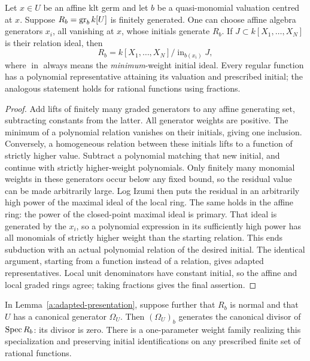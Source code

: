 \begin{lemma}\label{a:adapted-presentation}
Let \(x\in U\) be an affine klt germ and let \(b\) be a quasi-monomial
valuation centred at \(x\). Suppose \(R_b=\operatorname{gr}_b k[U]\) is finitely
generated. One can choose affine algebra generators \(x_i\), all
vanishing at \(x\), whose initials generate \(R_b\). If
\(J\subset k[X_1,\ldots,X_N]\) is their relation ideal, then
\[
 R_b=k[X_1,\ldots,X_N]/\operatorname{in}_{b(x_i)}J,
\]
where \(\operatorname{in}\) always means the \emph{minimum}-weight
initial ideal. Every regular function has a polynomial representative
attaining its valuation and prescribed initial; the analogous statement
holds for rational functions using fractions.
\end{lemma}

\begin{proof}
Add lifts of finitely many graded generators to any affine generating
set, subtracting constants from the latter. All generator weights are
positive. The minimum of a polynomial relation vanishes on their
initials, giving one inclusion. Conversely, a homogeneous relation
between these initials lifts to a function of strictly higher value.
Subtract a polynomial matching that new initial, and continue with
strictly higher-weight polynomials. Only finitely many monomial weights in these generators
occur below any fixed bound, so the residual value can be made
arbitrarily large. Log Izumi then puts the residual in an arbitrarily
high power of the maximal ideal of the local ring. The same holds in
the affine ring: the power of the closed-point maximal ideal is primary.
That ideal is generated by the \(x_i\), so a polynomial expression in
its sufficiently high power has all monomials of strictly higher weight
than the starting relation. This ends subduction with an actual
polynomial relation of the desired initial. The identical argument,
starting from a function instead of a relation, gives adapted
representatives. Local unit denominators have constant initial, so the
affine and local graded rings agree; taking fractions gives the final
assertion.
\end{proof}

\begin{lemma}\label{a:canonical-specialization}
In Lemma~\ref{a:adapted-presentation}, suppose further that \(R_b\) is
normal and that \(U\) has a canonical generator \(\Omega_U\).
Then \((\Omega_U)_b\) generates the canonical divisor of
\(\operatorname{Spec} R_b\): its divisor is zero. There is a one-parameter weight
family realizing this specialization and preserving initial
identifications on any prescribed finite set of rational functions.
\end{lemma}

